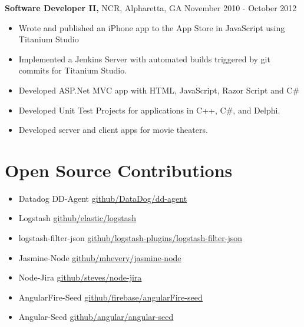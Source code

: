 \documentclass[margin]{res}
\begin{document}
\begin{resume}
    {\bf Software Developer II,} NCR, Alpharetta, GA \hfill November 2010 - October
    2012
        \begin{itemize} \itemsep -2pt
            \item Wrote and published an iPhone app to the App Store in JavaScript
                using Titanium Studio
            \item Implemented a Jenkins Server with automated builds triggered by
                git commits for Titanium Studio.
            \item Developed ASP.Net MVC app with HTML, JavaScript, Razor Script and
                C\#
            \item Developed Unit Test Projects for applications in C++, C\#, and
                Delphi.
            \item Developed server and client apps for movie theaters.
        \end{itemize}

\section{Open Source Contributions}
    \begin{itemize}
        \item Datadog DD-Agent
            \href{https://github.com/DataDog/dd-agent}{\underline{github/DataDog/dd-agent}}
        \item Logstash
            \href{https://github.com/elastic/logstash}{\underline{github/elastic/logstash}}
        \item logstash-filter-json
            \href{https://github.com/logstash-plugins/logstash-filter-json}{\underline{github/logstash-plugins/logstash-filter-json}}
        \item Jasmine-Node
            \href{https://github.com/mhevery/jasmine-node}{\underline{github/mhevery/jasmine-node}}
        \item Node-Jira
            \href{https://github.com/steves/node-jira}{\underline{github/steves/node-jira}}
        \item AngularFire-Seed
            \href{https://github.com/firebase/angularFire-seed}{\underline{github/firebase/angularFire-seed}}
        \item Angular-Seed
            \href{https://github.com/angular/angular-seed}{\underline{github/angular/angular-seed}}
    \end{itemize}


\end{resume}
\end{document}
